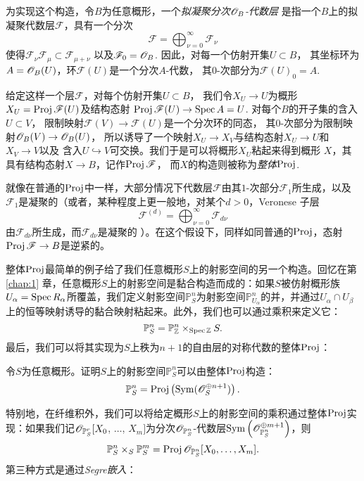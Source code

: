 为实现这个构造，令$B$为任意概形，一个\textit{拟凝聚分次$\mathscr{O}_B$-代数层}
是指一个$B$上的拟凝聚代数层$\mathscr F$，具有一个分次
\[
	\mathscr F=\bigoplus_{\nu=0}^\infty \mathscr F_\nu
\]
使得$\mathscr F_\nu \mathscr F_\mu\subset \mathscr F_{\mu+\nu}$
以及$\mathscr F_0=\mathscr{O}_B$. 因此，对每一个仿射开集$U\subset B$，
其坐标环为$A=\mathscr{O}_B(U)$，环$\mathscr{F}(U)$是一个分次$A$-代数，
其$0$-次部分为$\mathscr F(U)_0=A$. 

给定这样一个层$\mathscr F$，对每个仿射开集$U\subset B$，
我们令$X_U\to U$为概形$X_U=\operatorname{Proj} \mathscr F(U)$及结构态射
$\operatorname{Proj} \mathscr F(U)\to \operatorname{Spec} A=U$. 对每个$B$的开子集的含入$U\subset V$，
限制映射$\mathscr F(V)\to \mathscr F(U)$是一个分次环的同态，
其$0$-次部分为限制映射$\mathscr{O}_B(V)\to \mathscr{O}_B(U)$，
所以诱导了一个映射$X_U\to X_V$与结构态射$X_U\to U$和$X_V\to V$以及
含入$U\hookrightarrow V$可交换。我们于是可以将概形$X_U$粘起来得到概形
$X$，其具有结构态射$X\to B$，记作$\operatorname{Proj} \mathscr F$，
而$X$的构造则被称为\textit{整体$\operatorname{Proj}$}.

就像在普通的$\operatorname{Proj}$中一样，大部分情况下代数层$\mathscr F$由其$1$-次部分$\mathscr F_1$所生成，以及$\mathscr F_1$是凝聚的（或者，某种程度上更一般地，对某个$d>0$，Veronese 子层
\[
	\mathscr F^{(d)}=\bigoplus_{\nu=0}^\infty \mathscr F_{d\nu}
\]
由$\mathscr F_{d\nu}$所生成，而$\mathscr F_{d\nu}$是凝聚的
）。在这个假设下，同样如同普通的$\operatorname{Proj}$，态射$\operatorname{Proj} \mathscr F\to B$是逆紧的。

整体$\operatorname{Proj}$最简单的例子给了我们任意概形$S$上的射影空间的另一个构造。回忆在第 \ref{chap:1} 章，任意概形$S$上的射影空间是黏合构造而成的：如果$S$被仿射概形族$U_\alpha=\operatorname{Spec} R_\alpha$所覆盖，我们定义射影空间$\mathbb P_S^n$为射影空间$\mathbb P_{U_\alpha}^n$的并，并通过$U_\alpha\cap U_\beta$上的恒等映射诱导的黏合映射粘起来。此外，我们也可以通过乘积来定义它：
\[
	\mathbb P_S^n=\mathbb P_{\mathbb Z}^n\times_{\operatorname{Spec} \mathbb Z}S.
\]
最后，我们可以将其实现为$S$上秩为$n+1$的自由层的对称代数的整体$\operatorname{Proj}$：

\begin{exe}\label{exe:3.22}
令$S$为任意概形。证明$S$上的射影空间$\mathbb P_S^n$可以由整体$\operatorname{Proj}$构造：
\[
	\mathbb P_S^n=\operatorname{Proj} \left(\operatorname{Sym}(\mathscr{O}_S^{\oplus n+1})\right).
\]
\end{exe}

特别地，在纤维积外，我们可以将给定概形$S$上的射影空间的乘积通过整体$\operatorname{Proj}$实现：如果我们记$\mathscr{O}_{\mathbb P_S^r}[X_0$, $\dots$, $X_m]$为分次$\mathscr{O}_{\mathbb P_S^n}$-代数层$\operatorname{Sym}\left(\mathscr{O}_{\mathbb P_S^n}^{\oplus m+1}\right)$，则
\[
	\mathbb P^n_S\times_S \mathbb P^m_S=\operatorname{Proj} \mathscr{O}_{\mathbb P^n_S}[X_0,\dots,X_m].
\]
第三种方式是通过\textit{Segre嵌入}：

